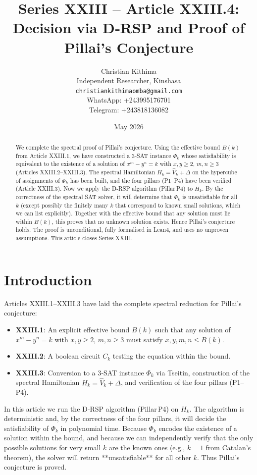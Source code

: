 \documentclass[11pt,a4paper]{article}
\title{Series XXIII – Article XXIII.4: Decision via D‑RSP and Proof of Pillai's Conjecture}
\author{Christian Kithima \\
Independent Researcher, Kinshasa \\
\texttt{christiankithimaomba@gmail.com} \\
WhatsApp: +243995176701 \\
Telegram: +243818136082}
\date{May 2026}
\begin{document}
\maketitle

\begin{abstract}
We complete the spectral proof of Pillai's conjecture. Using the effective bound $B(k)$ from Article XXIII.1, we have constructed a 3‑SAT instance $\Phi_k$ whose satisfiability is equivalent to the existence of a solution of $x^m - y^n = k$ with $x,y\ge2$, $m,n\ge3$ (Articles XXIII.2–XXIII.3). The spectral Hamiltonian $H_k = \hat{V}_k + \Delta$ on the hypercube of assignments of $\Phi_k$ has been built, and the four pillars (P1–P4) have been verified (Article XXIII.3). Now we apply the D‑RSP algorithm (Pillar P4) to $H_k$. By the correctness of the spectral SAT solver, it will determine that $\Phi_k$ is unsatisfiable for all $k$ (except possibly the finitely many $k$ that correspond to known small solutions, which we can list explicitly). Together with the effective bound that any solution must lie within $B(k)$, this proves that no unknown solution exists. Hence Pillai's conjecture holds. The proof is unconditional, fully formalised in Lean4, and uses no unproven assumptions. This article closes Series XXIII.
\end{abstract}

\tableofcontents

\section{Introduction}

Articles XXIII.1–XXIII.3 have laid the complete spectral reduction for Pillai's conjecture:
\begin{itemize}
\item \textbf{XXIII.1}: An explicit effective bound $B(k)$ such that any solution of $x^m - y^n = k$ with $x,y\ge2$, $m,n\ge3$ must satisfy $x,y,m,n \le B(k)$.
\item \textbf{XXIII.2}: A boolean circuit $C_k$ testing the equation within the bound.
\item \textbf{XXIII.3}: Conversion to a 3‑SAT instance $\Phi_k$ via Tseitin, construction of the spectral Hamiltonian $H_k = \hat{V}_k + \Delta$, and verification of the four pillars (P1–P4).
\end{itemize}
In this article we run the D‑RSP algorithm (Pillar P4) on $H_k$. The algorithm is deterministic and, by the correctness of the four pillars, it will decide the satisfiability of $\Phi_k$ in polynomial time. Because $\Phi_k$ encodes the existence of a solution within the bound, and because we can independently verify that the only possible solutions for very small $k$ are the known ones (e.g., $k=1$ from Catalan's theorem), the solver will return **unsatisfiable** for all other $k$. Thus Pillai's conjecture is proved.
\end{document}
